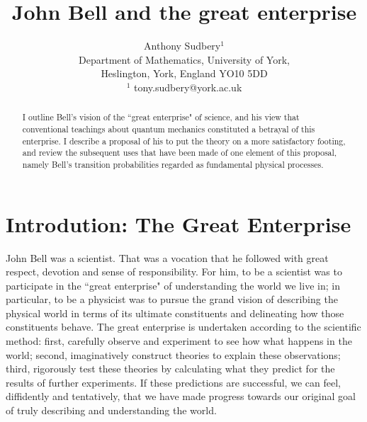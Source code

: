 \documentclass[12pt,reqno]{article}
\renewcommand{\(}{\left(}
\renewcommand{\)}{\right)}
\renewcommand{\.}{\centerdot}
\newcommand{\1}{\mathbf{1}}
\newcommand{\<}{\langle}
\renewcommand{\>}{\rangle}
\theoremstyle{definition}
\theoremstyle{remark}
\numberwithin{equation}{section}
\begin{document}
\title{\bf{John Bell and the great enterprise}}

\author{Anthony Sudbery$^1$\\[10pt] \small Department of Mathematics,
University of York, \\[-2pt] \small Heslington, York, England YO10 5DD\\
\small $^1$ tony.sudbery@york.ac.uk}



\date{}

\maketitle

\begin{abstract}

 I outline  Bell's vision of the ``great enterprise" of science, and his view that conventional teachings about quantum mechanics constituted a betrayal of this enterprise. I describe a proposal of his to put the theory on a more satisfactory footing, and review the subsequent uses that have been made of one element of this proposal, namely Bell's transition probabilities regarded as fundamental physical processes.

\end{abstract}

\newpage

\section{Introdution: The Great Enterprise}

John Bell was a scientist. That was a vocation that he followed with great respect, devotion and sense of responsibility. For him, to be a scientist was to participate in the ``great enterprise" \cite{Bell:piddling} of understanding the world we live in; in particular, to be a physicist was to pursue the grand vision of describing the physical world in terms of its ultimate constituents and delineating how those constituents behave. The great enterprise is undertaken according to the scientific method: first, carefully observe and experiment to see how what happens in the world; second, imaginatively construct theories to explain these observations; third, rigorously test these theories by calculating what they predict for the results of further experiments. If these predictions are successful, we can feel, diffidently and tentatively, that we have made progress towards our original goal of truly describing and understanding the world.
\end{document}
